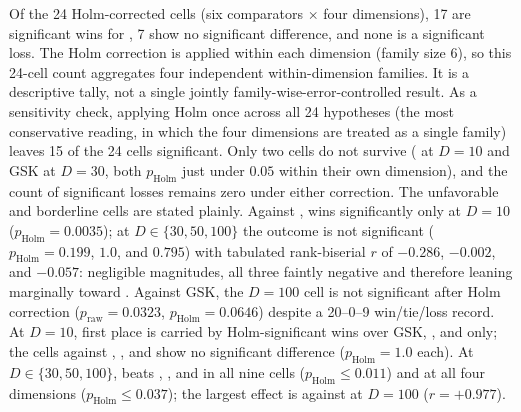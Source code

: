 \begin{table}[H]
\caption{\dtgsk{} vs.\ each GSK-family comparator on CEC2017 (29
functions, 51 runs, per-function mean error), in two aligned sub-tables:
$D \in \{10, 30\}$ above, $D \in \{50, 100\}$ below. Columns are the
across-function Wilcoxon signed-rank $p$ and its Holm-corrected value
(family $= 6$ comparators per dimension, $\alpha = 0.05$), win/tie/loss
counts with tie rule $|\Delta| < 10^{-8}$, the matched-pairs rank-biserial
effect size $r$ ($> 0$ favors \dtgsk{}), and the Holm decision ($+$ better,
$=$ no significant difference, $-$ worse).}\label{tab:wilcoxon-holm}
\centering
\tablesize{\footnotesize}
\setlength{\tabcolsep}{2.6pt}

\end{table}

Of the 24 Holm-corrected cells (six comparators $\times$ four
dimensions), 17 are significant wins for \dtgsk{}, 7 show no
significant difference, and none is a significant loss. The Holm correction is
applied within each dimension (family size 6), so this 24-cell count aggregates
four independent within-dimension families. It is a descriptive tally,
not a single jointly family-wise-error-controlled result.
As a sensitivity check, applying Holm once across all 24 hypotheses (the
most conservative reading, in which the four dimensions are treated as a
single family) leaves 15 of the 24 cells significant. Only two cells do
not survive (\atmals{} at $D = 10$ and GSK at $D = 30$, both
$p_{\mathrm{Holm}}$ just under $0.05$ within their own dimension), and the
count of significant losses remains zero under either correction.
The unfavorable and borderline cells are stated plainly. Against
\egsk{}, \dtgsk{} wins significantly only at $D = 10$
($p_{\mathrm{Holm}} = 0.0035$); at $D \in \{30, 50, 100\}$ the
outcome is not significant ($p_{\mathrm{Holm}} = 0.199$, $1.0$, and $0.795$)
with tabulated rank-biserial $r$ of $-0.286$, $-0.002$, and $-0.057$:
negligible magnitudes, all three faintly negative and therefore leaning
marginally toward \egsk{}.
Against GSK, the $D = 100$ cell is not significant after Holm correction
($p_{\mathrm{raw}} = 0.0323$, $p_{\mathrm{Holm}} = 0.0646$) despite a
20--0--9 win/tie/loss record.
At $D = 10$, first place is carried by Holm-significant wins over
GSK, \atmals{}, and \egsk{} only; the cells against \agsk{},
\apgsk{}, and \fdbagsk{} show no significant difference
($p_{\mathrm{Holm}} = 1.0$ each).
At $D \in \{30, 50, 100\}$, \dtgsk{} beats \agsk{}, \apgsk{}, and
\fdbagsk{} in all nine cells ($p_{\mathrm{Holm}} \leq 0.011$) and
\atmals{} at all four dimensions
($p_{\mathrm{Holm}} \leq 0.037$); the largest effect is against
\apgsk{} at $D = 100$ ($r = +0.977$).

